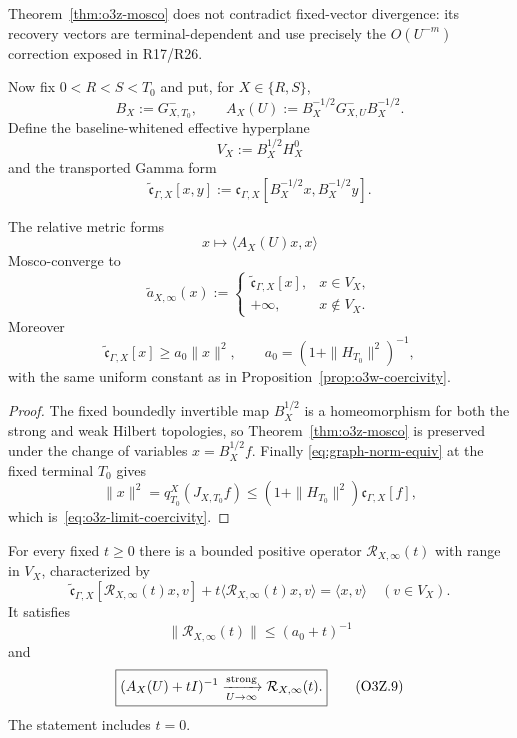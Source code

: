 Theorem~\ref{thm:o3z-mosco} does not contradict fixed-vector divergence: its recovery
vectors are terminal-dependent and use precisely the $O(U^{-m})$ correction exposed in
R17/R26.

Now fix $0<R<S<T_0$ and put, for $X\in\{R,S\}$,
\[
 B_X:=G_{X,T_0}^-,
 \qquad
 A_X(U):=B_X^{-1/2}G_{X,U}^-B_X^{-1/2}.
\]
Define the baseline-whitened effective hyperplane
\[
 V_X:=B_X^{1/2}H_X^0
\]
and the transported Gamma form
\[
 \widetilde{\mathfrak c}_{\Gamma,X}[x,y]
 :=\mathfrak c_{\Gamma,X}[B_X^{-1/2}x,B_X^{-1/2}y].
\]

\begin{corollary}
\label{cor:o3z-whitened-mosco}
The relative metric forms
\[
 x\longmapsto\langle A_X(U)x,x\rangle
\]
Mosco-converge to
\[
 \boxed{
 \widetilde a_{X,\infty}(x)
 :=
 \begin{cases}
 \widetilde{\mathfrak c}_{\Gamma,X}[x],&x\in V_X,\\[2pt]
 +\infty,&x\notin V_X.
 \end{cases}
 }
\tag{O3Z.6}\label{eq:o3z-whitened-limit}
\]
Moreover
\[
 \widetilde{\mathfrak c}_{\Gamma,X}[x]
 \ge a_0\|x\|^2,
 \qquad
 a_0=(1+\|H_{T_0}\|^2)^{-1},
\tag{O3Z.7}\label{eq:o3z-limit-coercivity}
\]
with the same uniform constant as in Proposition~\ref{prop:o3w-coercivity}.
\end{corollary}

\begin{proof}
The fixed boundedly invertible map $B_X^{1/2}$ is a homeomorphism for both the strong
and weak Hilbert topologies, so Theorem~\ref{thm:o3z-mosco} is preserved under the
change of variables $x=B_X^{1/2}f$.  Finally
\eqref{eq:graph-norm-equiv} at the fixed terminal $T_0$ gives
\[
 \|x\|^2
 =q_{T_0}^X(J_{X,T_0}f)
 \le(1+\|H_{T_0}\|^2)\mathfrak c_{\Gamma,X}[f],
\]
which is~\eqref{eq:o3z-limit-coercivity}.
\end{proof}

\begin{theorem}
\label{thm:o3z-resolvent-limit}
For every fixed $t\ge0$ there is a bounded positive operator
$\mathcal R_{X,\infty}(t)$ with range in $V_X$, characterized by
\[
 \boxed{
 \widetilde{\mathfrak c}_{\Gamma,X}
 [\mathcal R_{X,\infty}(t)x,v]
 +t\langle\mathcal R_{X,\infty}(t)x,v\rangle
 =\langle x,v\rangle
 \quad(v\in V_X).
 }
\tag{O3Z.8}\label{eq:o3z-limit-riesz}
\]
It satisfies
\[
 \|\mathcal R_{X,\infty}(t)\|\le(a_0+t)^{-1}
\]
and
\[
 \boxed{
 (A_X(U)+tI)^{-1}
 \xrightarrow[U\to\infty]{\rm strong}
 \mathcal R_{X,\infty}(t).
 }
\tag{O3Z.9}\label{eq:o3z-resolvent-strong}
\]
The statement includes $t=0$.
\end{theorem}

